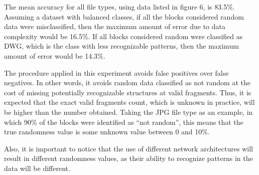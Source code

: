 The mean accuracy for all file types, using data listed in figure 6, is 83.5\%.  Assuming a dataset with balanced classes, if all the blocks considered random data were misclassified, then the maximum amount of error due to data complexity would be 16.5\%. If all blocks considered random were classified as DWG, which is the class with less recognizable patterns, then the maximum amount of error would be 14.3\%.


The procedure applied in this experiment avoids false positives over false negatives. In other words, it avoids random data classified as not random at the cost of missing potentially recognizable structures at valid fragments. Thus, it is expected that the exact valid fragments count, which is unknown in practice, will be higher than the number obtained. Taking the JPG file type as an example, in which 90\% of the blocks were identified as ``not random'', this means that the true randomness value is some unknown value between 0 and 10\%.

Also, it is important to notice that the use of different network architectures will result in different randomness values, as their ability to recognize patterns in the data will be different.



